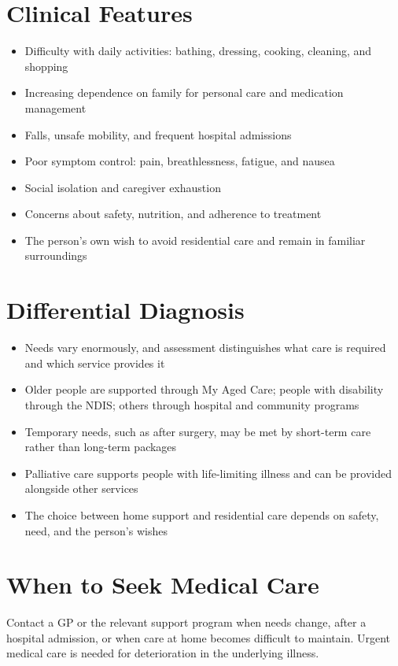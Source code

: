 \section*{Clinical Features}
\begin{itemize}
    \item Difficulty with daily activities: bathing, dressing, cooking, cleaning, and shopping
    \item Increasing dependence on family for personal care and medication management
    \item Falls, unsafe mobility, and frequent hospital admissions
    \item Poor symptom control: pain, breathlessness, fatigue, and nausea
    \item Social isolation and caregiver exhaustion
    \item Concerns about safety, nutrition, and adherence to treatment
    \item The person's own wish to avoid residential care and remain in familiar surroundings
\end{itemize}

\section*{Differential Diagnosis}
\begin{itemize}
    \item Needs vary enormously, and assessment distinguishes what care is required and which service provides it
    \item Older people are supported through My Aged Care; people with disability through the NDIS; others through hospital and community programs
    \item Temporary needs, such as after surgery, may be met by short-term care rather than long-term packages
    \item Palliative care supports people with life-limiting illness and can be provided alongside other services
    \item The choice between home support and residential care depends on safety, need, and the person's wishes
\end{itemize}

\section*{When to Seek Medical Care}
Contact a GP or the relevant support program when needs change, after a hospital admission, or when care at home becomes difficult to maintain. Urgent medical care is needed for deterioration in the underlying illness.

